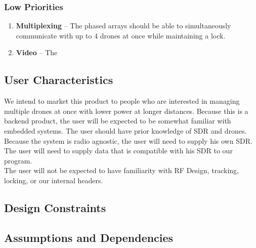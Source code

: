 \documentclass[ProjectRequirements.tex]{subfiles}
\begin{document}
		\subsubsection{Low Priorities}
			\begin{enumerate}
				\item \textbf{Multiplexing} -- The phased arrays should be able to simultaneously communicate with up to 4 drones at once while maintaining a lock.
				\item \textbf{Video} -- The 
			\end{enumerate}
		
	\subsection{User Characteristics}
		We intend to market this product to people who are interested in managing multiple drones at once with lower power at longer distances. Because this is a backend product, the user will be expected to be somewhat familiar with embedded systems. The user should have prior knowledge of SDR and drones. Because the system is radio agnostic, the user will need to supply his own SDR. The user will need to supply data that is compatible with his SDR to our program.\\
		
		The user will not be expected to have familiarity with RF Design, tracking, locking, or our internal headers.
		
	\subsection{Design Constraints}
	
	\subsection{Assumptions and Dependencies}
	
\end{document}
